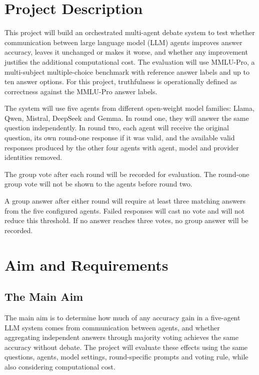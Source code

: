 \documentclass[12pt,a4paper]{article}
\begin{document}

\section{Project Description}

This project will build an orchestrated multi-agent debate system to test
whether communication between large language model (LLM) agents improves answer
accuracy, leaves it unchanged or makes it worse, and whether any improvement
justifies the additional computational cost. The evaluation will use MMLU-Pro,
a multi-subject multiple-choice benchmark with reference answer labels and up
to ten answer options. For this project, truthfulness is operationally defined
as correctness against the MMLU-Pro answer labels.

The system will use five agents from different open-weight model families:
Llama, Qwen, Mistral, DeepSeek and Gemma. In round one, they will answer the
same question independently. In round two, each agent will receive the original
question, its own round-one response if it was valid, and the available valid
responses produced by the other four agents with agent, model and provider
identities removed.

The group vote after each round will be recorded for evaluation. The round-one
group vote will not be shown to the agents before round two.

A group answer after either round will require at least three matching answers
from the five configured agents. Failed responses will cast no vote and will
not reduce this threshold. If no answer reaches three votes, no group answer
will be recorded.


\section{Aim and Requirements}

\subsection{The Main Aim}

The main aim is to determine how much of any accuracy gain in a five-agent LLM system comes from communication between agents, and whether aggregating independent answers through majority voting achieves the same accuracy without debate. The project will evaluate these effects using the same questions, agents, model settings, round-specific prompts and voting rule, while also considering computational cost.
\end{document}
